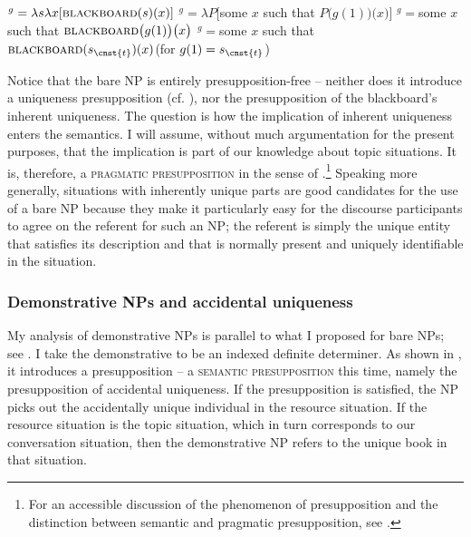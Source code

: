 \documentclass[output=paper,colorlinks,citecolor=brown,newtxmath]{langscibook}
\begin{document}
\ea \label{simik:comp:bare-NP}
\ea {}$^g=\lambda s\lambda x[\textsc{blackboard}(s)(x)]$
\ex {}$^g=\lambda P\big[$some $x$ such that $P\big(g(1)\big)\big(x\big)\big]$
\ex {}$^g={}$some $x$ such that $\textsc{blackboard}\big(g(1)\big)\big(x\big)$
\ex {}$^g={}$some $x$ such that $\textsc{blackboard}(s_{\cnst{t}})(x)$\hfill (for $g(1)=s_{\cnst{t}}$)
\z\z

\noindent Notice that the bare NP is entirely presupposition-free -- neither does it introduce a uniqueness presupposition (cf. \citealt{Dayal2004}), nor the presupposition of the blackboard's inherent uniqueness. The question is how the implication of inherent uniqueness enters the semantics. I will assume, without much argumentation for the present purposes, that the implication is part of our knowledge about topic situations. It is, therefore, a \textsc{pragmatic presupposition} in the sense of \citet{Stalnaker1974}.\footnote{For an accessible discussion of the phenomenon of presupposition and the distinction between semantic and pragmatic presupposition, see \citet{Beaver.Geurts2014}.} Speaking more generally, situations with inherently unique parts are good candidates for the use of a bare NP because they make it particularly easy for the discourse participants to agree on the referent for such an NP; the referent is simply the unique entity that satisfies its description and that is normally present and uniquely identifiable in the situation.

\largerpage[-2] %

\subsubsection{Demonstrative NPs and accidental uniqueness}\label{simik:sec:dem-nps-accidental}

My analysis of demonstrative NPs is parallel to what I proposed for bare NPs; see . I take the demonstrative to be an indexed definite determiner. As shown in , it introduces a presupposition -- a \textsc{semantic presupposition} this time, namely the presupposition of accidental uniqueness. If the presupposition is satisfied, the NP picks out the accidentally unique individual in the resource situation. If the resource situation is the topic situation, which in turn corresponds to our conversation situation, then the demonstrative NP refers to the unique book in that situation.
\end{document}

